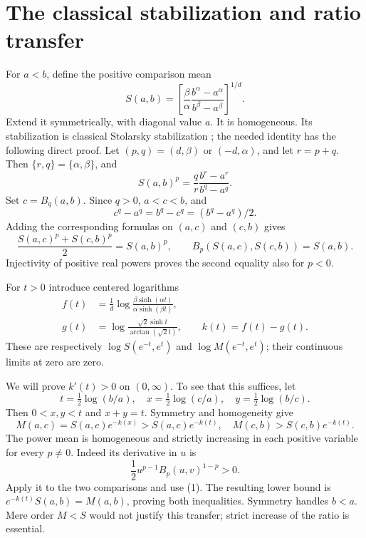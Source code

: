\documentclass[11pt]{article}
\newcommand{\atan}{\operatorname{arctan}}
\begin{document}
\section{The classical stabilization and ratio transfer}
For $a<b$, define the positive comparison mean
\[
S(a,b)=\left[\frac\beta\alpha\frac{b^\alpha-a^\alpha}{b^\beta-a^\beta}\right]^{1/d}.
\]
Extend it symmetrically, with diagonal value $a$. It is homogeneous. Its stabilization is classical Stolarsky stabilization \cite{R}; the needed identity has the following direct proof. Let $(p,q)=(d,\beta)$ or $(-d,\alpha)$, and let $r=p+q$. Then $\{r,q\}=\{\alpha,\beta\}$, and
\[
 S(a,b)^p=\frac qr\frac{b^r-a^r}{b^q-a^q}.
\]
Set $c=B_q(a,b)$. Since $q>0$, $a<c<b$, and
\[
 c^q-a^q=b^q-c^q=(b^q-a^q)/2.
\]
Adding the corresponding formulas on $(a,c)$ and $(c,b)$ gives
\[
 \frac{S(a,c)^p+S(c,b)^p}{2}=S(a,b)^p,
 \qquad B_p(S(a,c),S(c,b))=S(a,b).                 \tag{1}
\]
Injectivity of positive real powers proves the second equality also for $p<0$.

For $t>0$ introduce centered logarithms
\begin{align*}
 f(t)&=\frac1d\log\frac{\beta\sinh(\alpha t)}{\alpha\sinh(\beta t)},\\
 g(t)&=\log\frac{\sqrt2\sinh t}{\atan(\sqrt2t)},\qquad k(t)=f(t)-g(t).
\end{align*}
These are respectively $\log S(e^{-t},e^t)$ and $\log M(e^{-t},e^t)$; their continuous limits at zero are zero.

We will prove $k'(t)>0$ on $(0,\infty)$. To see that this suffices, let
\[
 t=\tfrac12\log(b/a),\quad x=\tfrac12\log(c/a),\quad y=\tfrac12\log(b/c).
\]
Then $0<x,y<t$ and $x+y=t$. Symmetry and homogeneity give
\[
 M(a,c)=S(a,c)e^{-k(x)}>S(a,c)e^{-k(t)},
 \quad M(c,b)>S(c,b)e^{-k(t)}.
\]
The power mean is homogeneous and strictly increasing in each positive variable for every $p\ne0$. Indeed its derivative in $u$ is
\[
 \frac12u^{p-1}B_p(u,v)^{1-p}>0.
\]
Apply it to the two comparisons and use (1). The resulting lower bound is $e^{-k(t)}S(a,b)=M(a,b)$, proving both inequalities. Symmetry handles $b<a$. Mere order $M<S$ would not justify this transfer; strict increase of the ratio is essential.
\newpage
\end{document}
